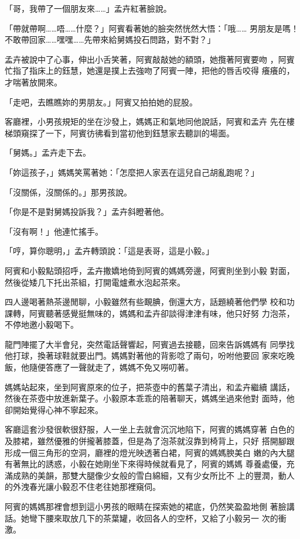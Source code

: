 「哥，我帶了一個朋友來……」孟卉紅著臉說。

「帶就帶啊……唔……什麼？」阿賓看著她的臉突然恍然大悟：「哦……
男朋友是嗎！不敢帶回家……嘿嘿……先帶來給舅媽投石問路，對不對？」

孟卉被說中了心事，伸出小舌笑著，阿賓敲敲她的額頭，她攬著阿賓要吻
，阿賓忙指了指床上的鈺慧，她還是撲上去強吻了阿賓一陣，把他的唇舌咬得
癢癢的，才喘著放開來。

「走吧，去瞧瞧妳的男朋友。」阿賓又拍拍她的屁股。

客廳裡，小男孩規矩的坐在沙發上，媽媽正和氣地同他說話，阿賓和孟卉
先在樓梯頭窺探了一下，阿賓彷彿看到當初他到鈺慧家去聽訓的場面。

「舅媽。」孟卉走下去。

「妳這孩子，」媽媽笑罵著她：「怎麼把人家丟在這兒自己胡亂跑呢？」

「沒關係，沒關係的。」那男孩說。

「你是不是對舅媽投訴我？」孟卉斜瞪著他。

「沒有啊！」他連忙搖手。

「哼，算你聰明，」孟卉轉頭說：「這是表哥，這是小毅。」

阿賓和小毅點頭招呼，孟卉撒嬌地倚到阿賓的媽媽旁邊，阿賓則坐到小毅
對面，然後從矮几下托出茶組，打開電爐煮水泡起茶來。

四人邊喝著熱茶邊閒聊，小毅雖然有些靦腆，倒還大方，話題繞著他們學
校和功課轉，阿賓聽著感覺挺無味的，媽媽和孟卉卻談得津津有味，他只好努
力泡茶，不停地邀小毅喝下。

龍門陣擺了大半會兒，突然電話聲響起，阿賓過去接聽，回來告訴媽媽有
同學找他打球，換著球鞋就要出門。媽媽對著他的背影唸了兩句，吩咐他要回
家來吃晚飯，他隨便答應了一聲就走了，媽媽不免又嘮叨著。

媽媽站起來，坐到阿賓原來的位子，把茶壺中的舊葉子清出，和孟卉繼續
講話，然後在茶壺中放進新葉子。小毅原本乖乖的陪著聊天，媽媽坐過來他對
面時，他卻開始覺得心神不寧起來。

客廳這套沙發很軟很舒服，人一坐上去就會沉沉地陷下，阿賓的媽媽穿著
白色的及膝裙，雖然優雅的併攏著膝蓋，但是為了泡茶就沒靠到椅背上，只好
搭開腳跟形成一個三角形的空洞，廳裡的燈光映透著白裙，阿賓的媽媽腴美白
嫩的內大腿有著無比的誘惑，小毅在她剛坐下來得時候就看見了，阿賓的媽媽
尊養處優，充滿成熟的美韻，那雙大腿像少女般的雪白綿細，又有少女所比不
上的豐潤，動人的外洩春光讓小毅忍不住老往她那裡窺伺。

阿賓的媽媽那裡會想到這小男孩的眼睛在探索她的裙底，仍然笑盈盈地側
著臉講話。她彎下腰來取放几下的茶葉罐，收回各人的空杯，又給了小毅另一
次的衝激。

